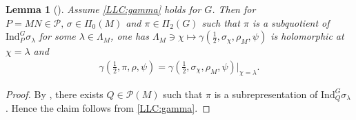 \documentclass[10pt]{amsart}
\newtheorem{lemma}[theorem]{Lemma}
\theoremstyle{definition}
\numberwithin{equation}{section}
\numberwithin{equation}{subsection}
\newcommand{\Ind}{\mathrm{Ind}}
\begin{document}
\begin{lemma}[{\cite[Proposition 3.4]{DRS}}] \label{lem:LLC7:subquo}   Assume \eqref{LLC:gamma} holds for $G$. Then for $P=MN\in\mathcal{P},\,\sigma\in\Pi_0(M)$  and $\pi\in\Pi_2(G)$ such that $\pi$ is a subquotient of $\Ind_P^G\sigma_\lambda$ for some $\lambda\in \Lambda_M$, one has $\Lambda_M\ni\chi\mapsto \gamma(\tfrac{1}{2},\sigma_\chi,\rho_M,\psi)$ is holomorphic at $\chi = \lambda$ and 
    \begin{align*}
        \gamma(\tfrac{1}{2},\pi,\rho,\psi) = \gamma(\tfrac{1}{2},\sigma_\chi,\rho_M,\psi)\vert_{\chi = \lambda}.
    \end{align*}
\end{lemma}
\begin{proof}  By \cite[Corollaire VI.5.4]{Representation-p-adic}, there exists $Q\in \mathcal{P}(M)$ such that $\pi$ is a subrepresentation of $\Ind_{Q}^G \sigma_\lambda$. Hence the claim follows from \eqref{LLC:gamma}.
\end{proof}
\end{document}
